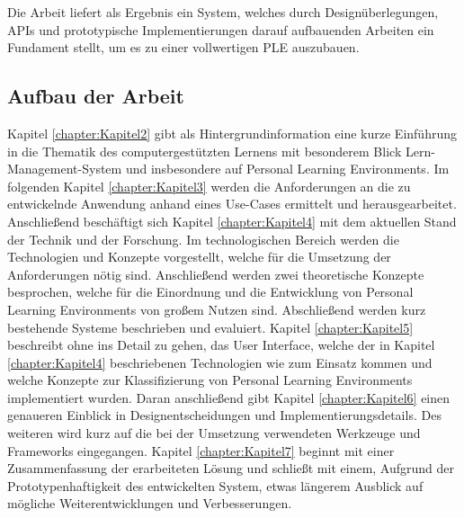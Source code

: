 Die Arbeit liefert als Ergebnis ein System, welches durch Designüberlegungen, APIs und prototypische Implementierungen darauf aufbauenden Arbeiten ein Fundament stellt, um es zu einer vollwertigen PLE auszubauen.

\subsection{Aufbau der Arbeit}
Kapitel \ref{chapter:Kapitel2} gibt als Hintergrundinformation eine kurze Einführung in die Thematik des computergestützten Lernens mit besonderem Blick Lern-Management-System und insbesondere auf Personal Learning Environments. Im folgenden Kapitel \ref{chapter:Kapitel3} werden die Anforderungen an die zu entwickelnde Anwendung anhand eines Use-Cases ermittelt und herausgearbeitet. Anschließend beschäftigt sich Kapitel \ref{chapter:Kapitel4} mit dem aktuellen Stand der Technik und der Forschung. Im technologischen Bereich werden die Technologien und Konzepte vorgestellt, welche für die Umsetzung der Anforderungen nötig sind. Anschließend werden zwei theoretische Konzepte besprochen, welche für die Einordnung und die Entwicklung von Personal Learning Environments von großem Nutzen sind. Abschließend werden kurz bestehende Systeme beschrieben und evaluiert. Kapitel \ref{chapter:Kapitel5} beschreibt ohne ins Detail zu gehen, das User Interface, welche der in Kapitel \ref{chapter:Kapitel4} beschriebenen Technologien wie zum Einsatz kommen und welche Konzepte zur Klassifizierung von Personal Learning Environments implementiert wurden. Daran anschließend gibt Kapitel \ref{chapter:Kapitel6} einen genaueren Einblick in Designentscheidungen und Implementierungsdetails. Des weiteren wird kurz auf die bei der Umsetzung verwendeten Werkzeuge und Frameworks eingegangen. Kapitel \ref{chapter:Kapitel7} beginnt mit einer Zusammenfassung der erarbeiteten Lösung und schließt mit einem, Aufgrund der Prototypenhaftigkeit des entwickelten System, etwas längerem Ausblick auf mögliche Weiterentwicklungen und Verbesserungen.
